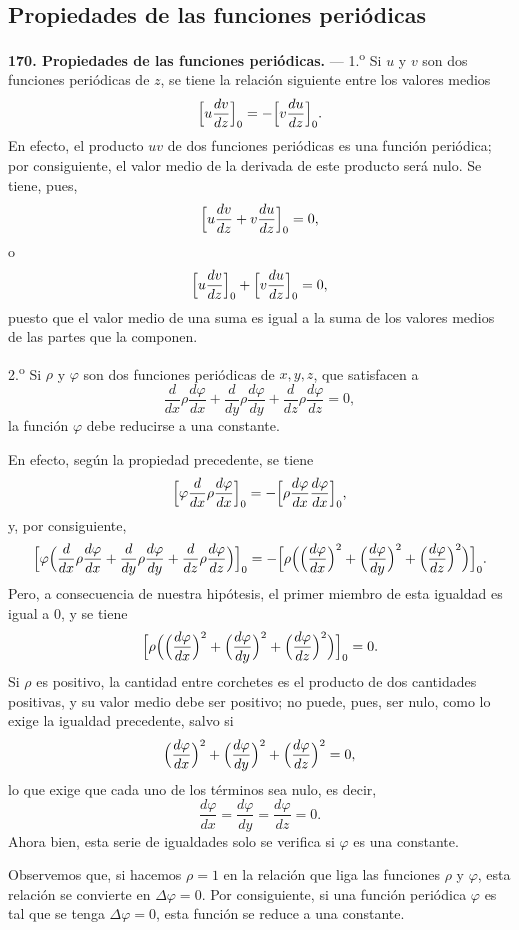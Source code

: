\subsection{Propiedades de las funciones periódicas}

\noindent\textbf{170. Propiedades de las funciones periódicas.} —
1.\textsuperscript{o} Si $u$ y $v$ son dos funciones periódicas de $z$, se
tiene la relación siguiente entre los valores medios
\[
\Bigl[u\frac{dv}{dz}\Bigr]_0=-\Bigl[v\frac{du}{dz}\Bigr]_0.
\]
En efecto, el producto $uv$ de dos funciones periódicas es una función
periódica; por consiguiente, el valor medio de la derivada de este
producto será nulo. Se tiene, pues,
\[
\Bigl[u\frac{dv}{dz}+v\frac{du}{dz}\Bigr]_0=0,
\]
o
\[
\Bigl[u\frac{dv}{dz}\Bigr]_0+\Bigl[v\frac{du}{dz}\Bigr]_0=0,
\]
puesto que el valor medio de una suma es igual a la suma de los valores
medios de las partes que la componen.

2.\textsuperscript{o} Si $\rho$ y $\varphi$ son dos funciones periódicas
de $x,y,z$, que satisfacen a
\[
\frac{d}{dx}\rho\frac{d\varphi}{dx}+\frac{d}{dy}\rho\frac{d\varphi}{dy}+\frac{d}{dz}\rho\frac{d\varphi}{dz}=0,
\]
la función $\varphi$ debe reducirse a una constante.

En efecto, según la propiedad precedente, se tiene
\[
\Bigl[\varphi\frac{d}{dx}\rho\frac{d\varphi}{dx}\Bigr]_0
=-\Bigl[\rho\frac{d\varphi}{dx}\frac{d\varphi}{dx}\Bigr]_0,
\]
y, por consiguiente,
\[
\Bigl[\varphi\Bigl(\frac{d}{dx}\rho\frac{d\varphi}{dx}+\frac{d}{dy}\rho\frac{d\varphi}{dy}+\frac{d}{dz}\rho\frac{d\varphi}{dz}\Bigr)\Bigr]_0
=-\Bigl[\rho\Bigl(\Bigl(\frac{d\varphi}{dx}\Bigr)^2+\Bigl(\frac{d\varphi}{dy}\Bigr)^2+\Bigl(\frac{d\varphi}{dz}\Bigr)^2\Bigr)\Bigr]_0.
\]
Pero, a consecuencia de nuestra hipótesis, el primer miembro de esta
igualdad es igual a $0$, y se tiene
\[
\Bigl[\rho\Bigl(\Bigl(\frac{d\varphi}{dx}\Bigr)^2+\Bigl(\frac{d\varphi}{dy}\Bigr)^2+\Bigl(\frac{d\varphi}{dz}\Bigr)^2\Bigr)\Bigr]_0=0.
\]
Si $\rho$ es positivo, la cantidad entre corchetes es el producto de dos
cantidades positivas, y su valor medio debe ser positivo; no puede, pues,
ser nulo, como lo exige la igualdad precedente, salvo si
\[
\Bigl(\frac{d\varphi}{dx}\Bigr)^2+\Bigl(\frac{d\varphi}{dy}\Bigr)^2+\Bigl(\frac{d\varphi}{dz}\Bigr)^2=0,
\]
lo que exige que cada uno de los términos sea nulo, es decir,
\[
\frac{d\varphi}{dx}=\frac{d\varphi}{dy}=\frac{d\varphi}{dz}=0.
\]
Ahora bien, esta serie de igualdades solo se verifica si $\varphi$ es una
constante.

Observemos que, si hacemos $\rho=1$ en la relación que liga las funciones
$\rho$ y $\varphi$, esta relación se convierte en $\Delta\varphi=0$. Por
consiguiente, si una función periódica $\varphi$ es tal que se tenga
$\Delta\varphi=0$, esta función se reduce a una constante.

